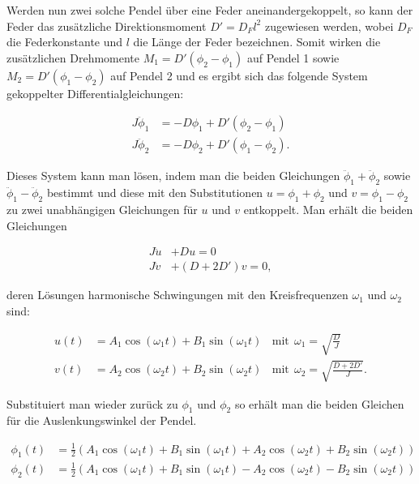 \documentclass{article}
\begin{document}
Werden nun zwei solche Pendel über eine Feder aneinandergekoppelt, so kann der Feder das zusätzliche Direktionsmoment $D' = D_F l^2$ zugewiesen werden, wobei $D_F$ die Federkonstante und $l$ die Länge der Feder bezeichnen. Somit wirken die zusätzlichen Drehmomente $M_1 = D' (\phi_2 - \phi_1)$ auf Pendel 1 sowie $M_2 = D' (\phi_1 - \phi_2)$ auf Pendel 2 und es ergibt sich das folgende System gekoppelter Differentialgleichungen:

\begin{equation}
    \begin{split}
        J \ddot{\phi}_1 &= -D \phi_1 + D' (\phi_2 - \phi_1) \\
        J \ddot{\phi}_2 &= -D \phi_2 + D' (\phi_1 - \phi_2).
    \end{split}
\end{equation}

Dieses System kann man lösen, indem man die beiden Gleichungen $\ddot{\phi}_1 + \ddot{\phi}_2$ sowie $\ddot{\phi}_1 - \ddot{\phi}_2$ bestimmt und diese mit den Substitutionen $u = \phi_1 + \phi_2$ und $v = \phi_1 - \phi_2$ zu zwei unabhängigen Gleichungen für $u$ und $v$ entkoppelt. Man erhält die beiden Gleichungen

\begin{equation}
    \begin{split}
        J \ddot{u} &+ Du = 0 \\
        J \ddot{v} &+ (D +2D')v = 0,
    \end{split}
\end{equation}

deren Lösungen harmonische Schwingungen mit den Kreisfrequenzen $\omega_1$ und $\omega_2$ sind:

\begin{equation}
    \begin{split}
        u(t) &= A_1 \cos{(\omega_1 t)} + B_1 \sin{(\omega_1 t)} \ \ \ \ \text{mit} \ \ \omega_1 = \sqrt{\frac{D}{J}} \\
        v(t) &= A_2 \cos{(\omega_2 t)} + B_2 \sin{(\omega_2 t)} \ \ \ \ \text{mit} \ \ \omega_2 = \sqrt{\frac{D+2D'}{J}}.
    \end{split}
\end{equation}

Substituiert man wieder zurück zu $\phi_1$ und $\phi_2$ so erhält man die beiden Gleichen für die Auslenkungswinkel der Pendel.

\begin{equation}
    \begin{split}
        \phi_1 (t) &= \frac{1}{2} \left( A_1 \cos{(\omega_1 t)} + B_1 \sin{(\omega_1 t)} + A_2 \cos{(\omega_2 t)} + B_2 \sin{(\omega_2 t)} \right) \\
        \phi_2 (t) &= \frac{1}{2} \left( A_1 \cos{(\omega_1 t)} + B_1 \sin{(\omega_1 t)} - A_2 \cos{(\omega_2 t)} - B_2 \sin{(\omega_2 t)} \right)
    \end{split}
    \label{eq:EOMsKoppl}
\end{equation}
\end{document}
